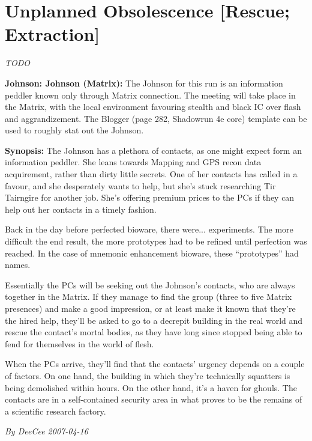 \documentclass[letterpaper,twocolumn,10.5pt]{article}
\newenvironment{scenario}[6]
	{
		\section{#1 {\small[#2]}}
		\textit{#3}
		\def\TMPSCENARIO{#4 #5}
	}
	{\small\textit{By \TMPSCENARIO}}
\newcommand{\johnson}[2]{\textbf{Johnson: #1 (#2):}}
\newcommand{\synopsis}{\textbf{Synopsis: }}
\begin{document}
\begin{scenario}{Unplanned Obsolescence}
	{Rescue; Extraction}
	{TODO}
	{DeeCee}
	{2007-04-16}
	{https://forum.rpg.net/showthread.php?321504-Shadowrun-4th-101-Instant-Scenarios\&p=7175559#post7175559}

\johnson{Johnson}{Matrix}  The Johnson for this run is an information peddler known only through Matrix connection. The meeting will take place in the Matrix, with the local environment favouring stealth and black IC over flash and aggrandizement. The Blogger (page 282, Shadowrun 4e core) template can be used to roughly stat out the Johnson.

\synopsis The Johnson has a plethora of contacts, as one might expect form an information peddler. She leans towards Mapping and GPS recon data acquirement, rather than dirty little secrets. One of her contacts has called in a favour, and she desperately wants to help, but she's stuck researching Tir Tairngire for another job. She's offering premium prices to the PCs if they can help out her contacts in a timely fashion.

Back in the day before perfected bioware, there were... experiments. The more difficult the end result, the more prototypes had to be refined until perfection was reached. In the case of mnemonic enhancement bioware, these ``prototypes'' had names.

Essentially the PCs will be seeking out the Johnson's contacts, who are always together in the Matrix. If they manage to find the group (three to five Matrix presences) and make a good impression, or at least make it known that they're the hired help, they'll be asked to go to a decrepit building in the real world and rescue the contact's mortal bodies, as they have long since stopped being able to fend for themselves in the world of flesh.

When the PCs arrive, they'll find that the contacts' urgency depends on a couple of factors. On one hand, the building in which they're technically squatters is being demolished within hours. On the other hand, it's a haven for ghouls. The contacts are in a self-contained security area in what proves to be the remains of a scientific research factory.


\end{scenario}
\end{document}
